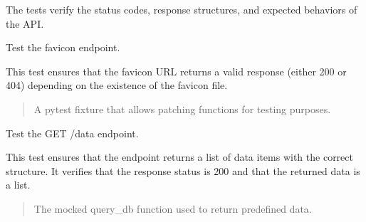 \documentclass[letterpaper,10pt,english]{sphinxmanual}
\begin{document}
\sphinxAtStartPar
The tests verify the status codes, response structures, and expected behaviors of the API.

\begin{fulllineitems}
\label{\detokenize{test.my_fastapi:test.my_fastapi.test_main.test_favicon}}
\pysigstartsignatures
\pysiglinewithargsret
{}
{}
{}
\pysigstopsignatures
\sphinxAtStartPar
Test the favicon endpoint.

\sphinxAtStartPar
This test ensures that the favicon URL returns a valid response (either 200 or 404) depending
on the existence of the favicon file.
\begin{quote}\begin{description}
\sphinxAtStartPar
{} \textendash{} A pytest fixture that allows patching functions for testing purposes.

\end{description}\end{quote}

\end{fulllineitems}


\begin{fulllineitems}
\label{\detokenize{test.my_fastapi:test.my_fastapi.test_main.test_get_all_data}}
\pysigstartsignatures
\pysiglinewithargsret
{}
{}
{}
\pysigstopsignatures
\sphinxAtStartPar
Test the GET /data endpoint.

\sphinxAtStartPar
This test ensures that the endpoint returns a list of data items with the correct structure.
It verifies that the response status is 200 and that the returned data is a list.
\begin{quote}\begin{description}
\sphinxAtStartPar
{} \textendash{} The mocked query\_db function used to return predefined data.

\end{description}\end{quote}

\end{fulllineitems}
\end{document}
